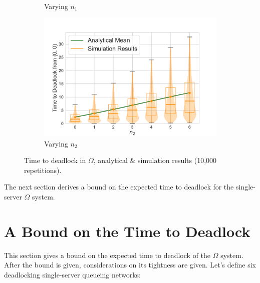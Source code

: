 \documentclass{article}
\numberwithin{equation}{section}
\begin{document}
\begin{figure}[!htbp]
\begin{center}
\begin{subfigure}[b]{0.48\textwidth}
  \caption{Varying $n_1$}
  \label{fig:timestodeadlockfb_n1}
\end{subfigure}
\begin{subfigure}[b]{0.48\textwidth}
  \includegraphics[width=\textwidth]{images/2Nmsfb_varyn2}
  \caption{Varying $n_2$}
  \label{fig:timestodeadlockfb_n2}
\end{subfigure}
\end{center}
\caption{Time to deadlock in $\Omega$, analytical \& simulation results
(10,000 repetitions).}
\label{fig:timestodeadlockfeedback}
\end{figure}



The next section derives a bound on the expected time to deadlock for the
single-server $\Omega$ system.


\section{A Bound on the Time to Deadlock}\label{sec:bound}

This section gives a bound on the expected time to deadlock of the $\Omega$
system.
After the bound is given, considerations on its tightness are given.
Let's define six deadlocking single-server queueing networks:
\end{document}
